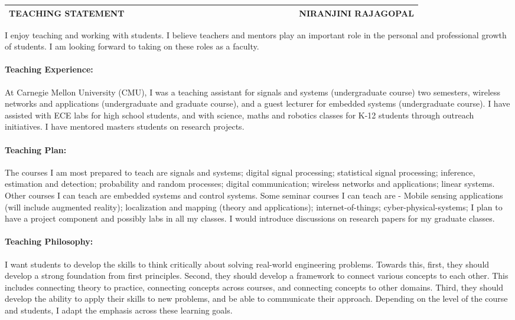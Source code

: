 \documentclass[10pt]{article}
\date{}
\begin{document}

\begin{table}
\color{blue}
\begin{tabular*}{\textwidth}{l r}
\large\textbf{TEACHING STATEMENT} & 
\hfill \ \ \ \ \ \ \ \ \ \ \ \ \ \ \ \ \ \ \ \
\ \ \ \ \ \ \ \ \ \ \ \ \ \ \ 
\large\textbf{NIRANJINI RAJAGOPAL}\\
\hline
\end{tabular*}

\end{table}


I enjoy teaching and working with students. I believe teachers and mentors play an important role in the personal and professional growth of students. I am looking forward to taking on these roles as a faculty.

\paragraph{Teaching Experience:}
At Carnegie Mellon University (CMU), I was a teaching assistant for signals and systems (undergraduate course) two semesters, wireless networks and applications (undergraduate and graduate course), and a guest lecturer for embedded systems (undergraduate course). I have assisted with ECE labs for high school students, and with science, maths and robotics classes for K-12 students through outreach initiatives. I have mentored masters students on research projects.  

\paragraph{Teaching Plan:}
The courses I am most prepared to teach are signals and systems;  digital signal processing; statistical signal processing; inference, estimation and detection; probability and random processes; digital communication; wireless networks and applications; linear systems. Other courses I can teach are embedded systems and control systems.
Some seminar courses I can teach are - Mobile sensing applications (will include augmented reality); localization and mapping (theory and applications); internet-of-things; cyber-physical-systems; 
I plan to have a project component  and possibly labs in all my classes. I would introduce discussions on research papers for my graduate classes.

\paragraph{Teaching Philosophy: }
I want students to develop the skills to think critically about solving real-world engineering problems. 
Towards this, first, they should develop a strong foundation from first principles. Second, they should develop a framework to connect various concepts to each other. This includes connecting theory to practice, connecting concepts across courses, and connecting concepts to other domains. Third, they should develop the ability to apply their skills to new problems, and be able to communicate their approach. Depending on the level of the course and students, I adapt the emphasis across these learning goals.\\
\end{document}
